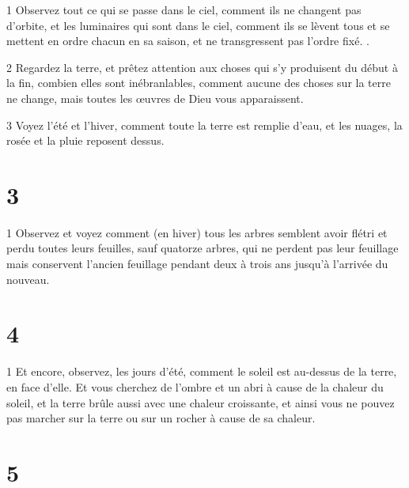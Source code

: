 \par 1 Observez tout ce qui se passe dans le ciel, comment ils ne changent pas d'orbite, et les luminaires qui sont dans le ciel, comment ils se lèvent tous et se mettent en ordre chacun en sa saison, et ne transgressent pas l'ordre fixé. .
\par 2 Regardez la terre, et prêtez attention aux choses qui s'y produisent du début à la fin, combien elles sont inébranlables, comment aucune des choses sur la terre ne change, mais toutes les œuvres de Dieu vous apparaissent.
\par 3 Voyez l'été et l'hiver, comment toute la terre est remplie d'eau, et les nuages, la rosée et la pluie reposent dessus.

\chapter{3}

\par 1 Observez et voyez comment (en hiver) tous les arbres semblent avoir flétri et perdu toutes leurs feuilles, sauf quatorze arbres, qui ne perdent pas leur feuillage mais conservent l'ancien feuillage pendant deux à trois ans jusqu'à l'arrivée du nouveau.

\chapter{4}

\par 1 Et encore, observez, les jours d'été, comment le soleil est au-dessus de la terre, en face d'elle. Et vous cherchez de l'ombre et un abri à cause de la chaleur du soleil, et la terre brûle aussi avec une chaleur croissante, et ainsi vous ne pouvez pas marcher sur la terre ou sur un rocher à cause de sa chaleur.

\chapter{5}

